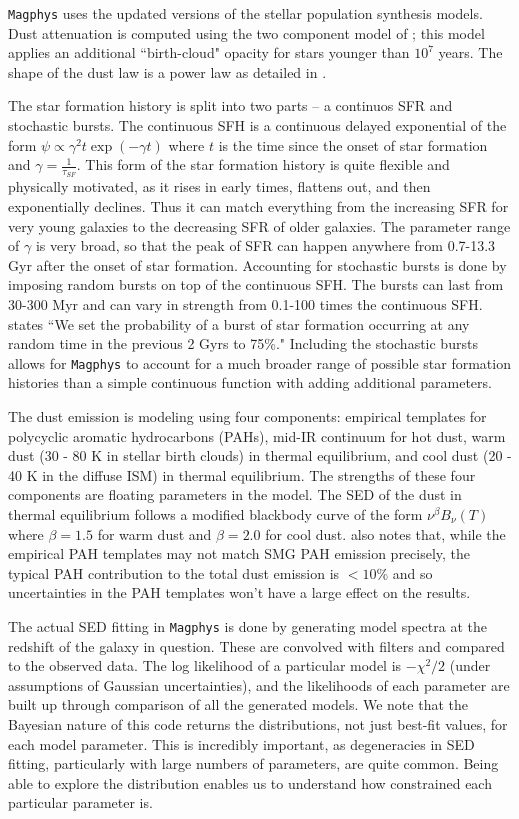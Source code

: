 \documentclass[preprint,natbib209]{aastex}
\begin{document}
\texttt{Magphys} uses the \cite{bruzual07} updated versions of the \cite{bruzual03} stellar population synthesis models. Dust attenuation is computed using the two component model of \cite{charlot00}; this model applies an additional ``birth-cloud" opacity for stars younger than $10^7$ years. The shape of the dust law is a power law as detailed in \cite{charlot00}. 

The star formation history is split into two parts -- a continuos SFR and stochastic bursts. The continuous SFH is a continuous delayed exponential of the form $\psi \propto \gamma^2 t \exp \left( -\gamma t \right)$ where $t$ is the time since the onset of star formation and $\gamma = \frac{1}{\tau_{SF}}$.  This form of the star formation history is quite flexible and physically motivated, as it rises in early times, flattens out, and then exponentially declines. Thus it can match everything from the increasing SFR for very young galaxies to the decreasing SFR of older galaxies. The parameter range of $\gamma$ is very broad, so that the peak of SFR can happen anywhere from 0.7-13.3 Gyr after the onset of star formation. Accounting for stochastic bursts is done by imposing random bursts on top of the continuous SFH. The bursts can last from 30-300 Myr and can vary in strength from 0.1-100 times the continuous SFH. \cite{dacunha15} states ``We set the probability of a burst of star formation occurring at any random time in the previous 2 Gyrs to 75\%." Including the stochastic bursts allows for \texttt{Magphys} to account for a much broader range of possible star formation histories than a simple continuous function with adding additional parameters.

The dust emission is modeling using four components: empirical templates for polycyclic aromatic hydrocarbons (PAHs), mid-IR continuum for hot dust, warm dust (30 - 80 K in stellar birth clouds) in thermal equilibrium, and cool dust (20 - 40 K in the diffuse ISM) in thermal equilibrium. The strengths of these four components are floating parameters in the model. The SED of the dust in thermal equilibrium follows a modified blackbody curve of the form $\nu^{\beta} B_\nu (T)$ where $\beta = 1.5$ for warm dust and $\beta = 2.0$ for cool dust. \cite{dacunha15} also notes that, while the empirical PAH templates may not match SMG PAH emission precisely, the typical PAH contribution to the total dust emission is $< 10\%$ and so uncertainties in the PAH templates won't have a large effect on the results.

The actual SED fitting in \texttt{Magphys} is done by generating model spectra at the redshift of the galaxy in question. These are convolved with filters and compared to the observed data. The log likelihood of a particular model is $-\chi^2 / 2$ (under assumptions of Gaussian uncertainties), and the likelihoods of each parameter are built up through comparison of all the generated models. We note that the Bayesian nature of this code returns the distributions, not just best-fit values, for each model parameter. This is incredibly important, as degeneracies in SED fitting, particularly with large numbers of parameters, are quite common. Being able to explore the distribution enables us to understand how constrained each particular parameter is.
\end{document}
